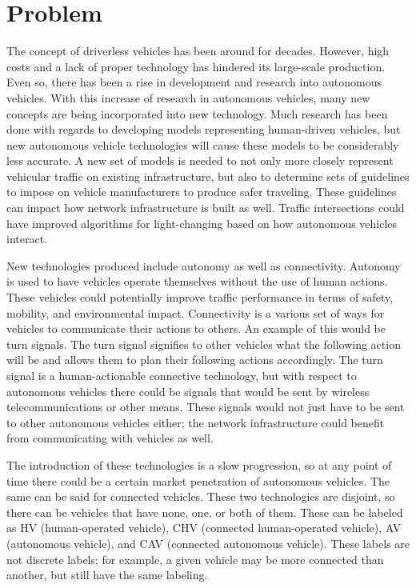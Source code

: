 \documentclass[onecolumn, draftclsnofoot,10pt, compsoc]{IEEEtran}
\begin{document}
\section{Problem}
The concept of driverless vehicles has been around for decades.
However, high costs and a lack of proper technology has hindered its large-scale production.
Even so, there has been a rise in development and research into autonomous vehicles.
With this increase of research in autonomous vehicles, many new concepts are being incorporated into new technology.
Much research has been done with regards to developing models representing human-driven vehicles, but new autonomous vehicle technologies will cause these models to be considerably less accurate.
A new set of models is needed to not only more closely represent vehicular traffic on existing infrastructure, but also to determine sets of guidelines to impose on vehicle manufacturers to produce safer traveling.
These guidelines can impact how network infrastructure is built as well.
Traffic intersections could have improved algorithms for light-changing based on how autonomous vehicles interact.

New technologies produced include autonomy as well as connectivity.
Autonomy is used to have vehicles operate themselves without the use of human actions.
These vehicles could potentially improve traffic performance in terms of safety, mobility, and environmental impact.
Connectivity is a various set of ways for vehicles to communicate their actions to others.
An example of this would be turn signals.
The turn signal signifies to other vehicles what the following action will be and allows them to plan their following actions accordingly.
The turn signal is a human-actionable connective technology, but with respect to autonomous vehicles there could be signals that would be sent by wireless telecommunications or other means.
These signals would not just have to be sent to other autonomous vehicles either; the network infrastructure could benefit from communicating with vehicles as well.

The introduction of these technologies is a slow progression, so at any point of time there could be a certain market penetration of autonomous vehicles.
The same can be said for connected vehicles.
These two technologies are disjoint, so there can be vehicles that have none, one, or both of them.
These can be labeled as HV (human-operated vehicle), CHV (connected human-operated vehicle), AV (autonomous vehicle), and CAV (connected autonomous vehicle).
These labels are not discrete labels; for example, a given vehicle may be more connected than another, but still have the same labeling.
\end{document}
